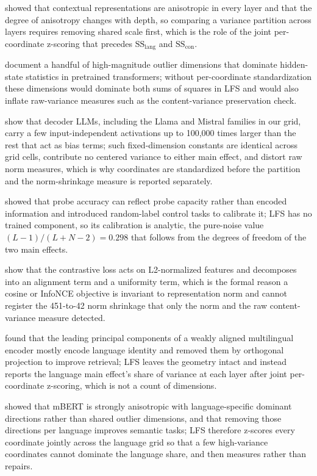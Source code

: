\documentclass{article} %
\begin{document}
\citet{ethayarajh2019contextual} showed that contextual representations are anisotropic in every layer and that the degree of anisotropy changes with depth, so comparing a variance partition across layers requires removing shared scale first, which is the role of the joint per-coordinate z-scoring that precedes $\mathrm{SS}_{\mathrm{lang}}$ and $\mathrm{SS}_{\mathrm{con}}$.

\citet{kovaleva2021outlier} document a handful of high-magnitude outlier dimensions that dominate hidden-state statistics in pretrained transformers; without per-coordinate standardization these dimensions would dominate both sums of squares in LFS and would also inflate raw-variance measures such as the content-variance preservation check.

\citet{sun2024massive} show that decoder LLMs, including the Llama and Mistral families in our grid, carry a few input-independent activations up to 100,000 times larger than the rest that act as bias terms; such fixed-dimension constants are identical across grid cells, contribute no centered variance to either main effect, and distort raw norm measures, which is why coordinates are standardized before the partition and the norm-shrinkage measure is reported separately.

\citet{hewitt2019control} showed that probe accuracy can reflect probe capacity rather than encoded information and introduced random-label control tasks to calibrate it; LFS has no trained component, so its calibration is analytic, the pure-noise value $(L-1)/(L+N-2)=0.298$ that follows from the degrees of freedom of the two main effects.

\citet{wang2020uniformity} show that the contrastive loss acts on L2-normalized features and decomposes into an alignment term and a uniformity term, which is the formal reason a cosine or InfoNCE objective is invariant to representation norm and cannot register the 451-to-42 norm shrinkage that only the norm and the raw content-variance measure detected.

\citet{yang2021bias} found that the leading principal components of a weakly aligned multilingual encoder mostly encode language identity and removed them by orthogonal projection to improve retrieval; LFS leaves the geometry intact and instead reports the language main effect's share of variance at each layer after joint per-coordinate z-scoring, which is not a count of dimensions.

\citet{rajaee2022isotropy} showed that mBERT is strongly anisotropic with language-specific dominant directions rather than shared outlier dimensions, and that removing those directions per language improves semantic tasks; LFS therefore z-scores every coordinate jointly across the language grid so that a few high-variance coordinates cannot dominate the language share, and then measures rather than repairs.
\end{document}
